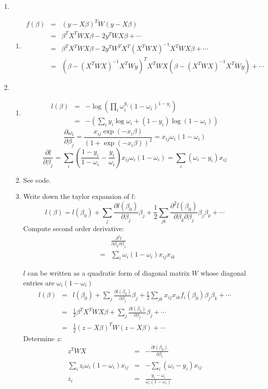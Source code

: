 \documentclass{article}
\begin{document}
\begin{enumerate}
\item
\begin{enumerate}[A]
\item
\begin{eqnarray}
f(\beta)&=&(y-X\beta)^TW(y-X\beta)\nonumber\\
&=&\beta^TX^TWX\beta-2y^TWX\beta+\cdots\nonumber\\
&=&\beta^T X^TWX\beta-2y^TW^TX^T(X^TWX)^{-1}X^TWX\beta+\cdots\nonumber\\
&=&(\beta-(X^TWX)^{-1}X^TWy)^TX^TWX(\beta-(X^TWX)^{-1}X^TWy)+\cdots
\end{eqnarray}
\end{enumerate}
\item
\begin{enumerate}[A]
\item
\begin{eqnarray}
l(\beta)&=&-\log(\prod_i\omega_i^{y_i}(1-\omega_i)^{1-y_i})\nonumber\\
&=&-(\sum_iy_i\log\omega_i+(1-y_i)\log(1-\omega_i))
\end{eqnarray}
\[
\frac{\partial\omega_i}{\partial\beta_j}=\frac{x_{ij}\exp(-x_i\beta)}{(1+\exp(-x_i\beta))^2}=x_{ij}\omega_i(1-\omega_i)
\]
\[
\frac{\partial l}{\partial\beta_j}=\sum_i(\frac{1-y_i}{1-\omega_i}-\frac{y_i}{\omega_i})x_{ij}\omega_i(1-\omega_i)=\sum_i(\omega_i-y_i)x_{ij}
\]
\item
See code.
\item
Write down the taylor expansion of $l$:
\[
l(\beta)=l(\beta_0)+\sum_j\frac{\partial l(\beta_0)}{\partial\beta_j}\beta_j+\frac{1}{2}\sum_{jk}\frac{\partial^2l(\beta_0)}{\partial\beta_k\partial\beta_j}\beta_j\beta_k+\cdots
\]
Compute second order derivative:
\begin{eqnarray}
&&\frac{\partial^2 l}{\partial\beta_k\partial\beta_j}\nonumber\\
&=&\sum_i\omega_i(1-\omega_i)x_{ij}x_{ik}
\end{eqnarray}

$l$ can be written as a quadratic form of diagonal matrix $W$ whose diagonal entries are $\omega_i(1-\omega_i)$
\begin{eqnarray}
l(\beta)&=&l(\beta_0)+\sum_j\frac{\partial l(\beta_0)}{\partial\beta_j}\beta_j+\frac{1}{2}\sum_{jk}x_{ij}x_{ik}f_i(\beta_0)\beta_j\beta_k+\cdots\nonumber\\
&=&\frac{1}{2}\beta^TX^TWX\beta+\sum_j\frac{\partial l(\beta_0)}{\partial\beta_j}\beta_j+\cdots\nonumber\\
&=&\frac{1}{2}(z-X\beta)^TW(z-X\beta)+\cdots
\end{eqnarray}
Determine $z$:
\begin{eqnarray}
z^TWX&=&-\frac{\partial l(\beta_0)}{\partial\beta_i}\nonumber\\
\sum_iz_i\omega_i(1-\omega_i)x_{ij}&=&-\sum_i(\omega_i-y_i)x_{ij}\nonumber\\
z_i&=&\frac{y_i-\omega_i}{\omega_i(1-\omega_i)}
\end{eqnarray}
\end{enumerate}
\end{enumerate}
\end{document}
